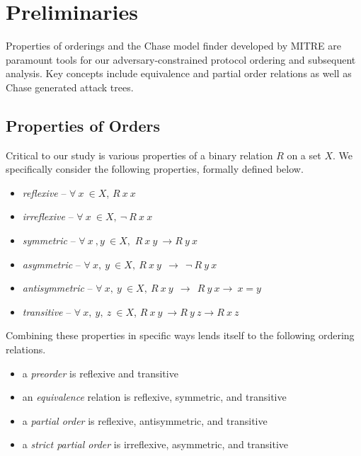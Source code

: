 \documentclass[runningheads]{llncs}
\theoremstyle{definition}
\newcommand{\squash}{\itemsep=0pt\parskip=0pt}
\begin{document}
\section{Preliminaries}

Properties of orderings and the Chase model finder developed by MITRE \cite{Ramsdell:2020:Chase} are paramount tools for our adversary-constrained protocol ordering and subsequent analysis. Key concepts include equivalence and partial order relations as well as Chase generated attack trees. 

\subsection*{Properties of Orders}

Critical to our study is various properties of a binary relation $R$ on a set $X$. We specifically consider the following properties, formally defined below.

\begin{itemize}
    \squash
    \item \emph{reflexive} -- $ \forall\: x\: \in X$, $R\: x\: x$
    \item \emph{irreflexive} -- $ \forall \: x\: \in X, \: \neg \: R\: x\: x$
    \item \emph{symmetric} -- $ \forall\: x\: , y\: \in X,$ $R\: x\: y\:\rightarrow R\: y\: x$
    \item \emph{asymmetric} --  $\forall\: x,\: y\:\in X,\: R\: x\: y\:\: \rightarrow  \:\: \neg \:R\: y\: x $  
    \item \emph{antisymmetric} --  $\forall\: x,\: y\:\in X,\: R\: x\: y\:\: \rightarrow \:\: R\: y\: x \rightarrow \:x = y$ 
    \item \emph{transitive} -- $ \forall\: x,\: y,\: z\:\in X$, $R\: x\: y\: \rightarrow R\: y\: z \rightarrow R\: x\: z$
\end{itemize}

\noindent Combining these properties in specific ways lends itself to the following ordering relations.

\begin{itemize}
    \squash
    \item a \emph{preorder} is reflexive and transitive
    \item an \emph{equivalence} relation is reflexive, symmetric, and transitive 
    \item a \emph{partial order} is reflexive, antisymmetric, and transitive 
    \item a \emph{strict partial order} is irreflexive, asymmetric, and transitive 
\end{itemize}
\end{document}
